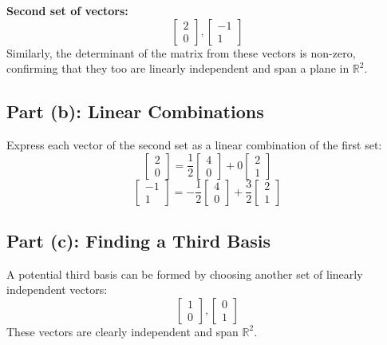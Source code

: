 \documentclass[12pt]{article}
\begin{document}
\textbf{Second set of vectors:}
\[
\begin{bmatrix} 2 \\ 0 \end{bmatrix}, \begin{bmatrix} -1 \\ 1 \end{bmatrix}
\]
Similarly, the determinant of the matrix from these vectors is non-zero, confirming that they too are linearly independent and span a plane in \(\mathbb{R}^2\).

\subsection*{Part (b): Linear Combinations}
Express each vector of the second set as a linear combination of the first set:
\[
\begin{bmatrix} 2 \\ 0 \end{bmatrix} = \frac{1}{2} \begin{bmatrix} 4 \\ 0 \end{bmatrix} + 0 \begin{bmatrix} 2 \\ 1 \end{bmatrix}
\]
\[
\begin{bmatrix} -1 \\ 1 \end{bmatrix} = -\frac{1}{2} \begin{bmatrix} 4 \\ 0 \end{bmatrix} + \frac{3}{2} \begin{bmatrix} 2 \\ 1 \end{bmatrix}
\]

\subsection*{Part (c): Finding a Third Basis}
A potential third basis can be formed by choosing another set of linearly independent vectors:
\[
\begin{bmatrix} 1 \\ 0 \end{bmatrix}, \begin{bmatrix} 0 \\ 1 \end{bmatrix}
\]
These vectors are clearly independent and span \(\mathbb{R}^2\).
\end{document}
